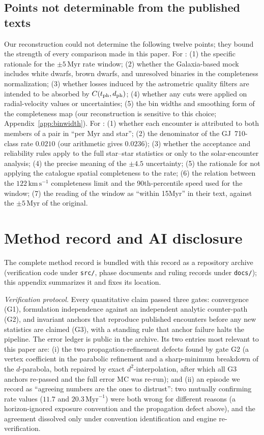 \documentclass[11pt]{article}
\newcommand{\Myr}{\,\mathrm{Myr}}
\newcommand{\kms}{\,\mathrm{km\,s^{-1}}}
\begin{document}
\subsection{Points not determinable from the published texts}
\label{app:limits}
Our reconstruction could not determine the following twelve points; they
bound the strength of every comparison made in this paper. For \cite{bj18}:
(1) the specific rationale for the $\pm5\Myr$ rate window; (2) whether the
Galaxia-based mock includes white dwarfs, brown dwarfs, and unresolved
binaries in the completeness normalization; (3) whether losses induced by
the astrometric quality filters are intended to be absorbed by
$C(t_{\rm ph},d_{\rm ph})$; (4) whether any cuts were applied on
radial-velocity values or uncertainties; (5) the bin widths and smoothing
form of the completeness map (our reconstruction is sensitive to this
choice; Appendix~\ref{app:binwidth}). For \cite{fp26}: (1) whether each
encounter is attributed to both members of a pair in ``per Myr and star'';
(2) the denominator of the GJ~710-class rate $0.0210$ (our arithmetic gives
$0.0236$); (3) whether the acceptance and reliability rules apply to the
full star--star statistics or only to the solar-encounter analysis; (4) the
precise meaning of the $\pm4.5$ uncertainty; (5) the rationale for not
applying the catalogue spatial completeness to the rate; (6) the relation
between the $122\kms$ completeness limit and the 90th-percentile speed used
for the window; (7) the reading of the \cite{bj18} window as ``within
15\;Myr'' in their text, against the $\pm5\Myr$ of the original.

\section{Method record and AI disclosure}\label{app:method}
The complete method record is bundled with this record as a repository
archive (verification code under \texttt{src/}, phase documents and ruling
records under \texttt{docs/}); this appendix summarizes it and fixes its
location.

\emph{Verification protocol.} Every quantitative claim passed three gates:
convergence (G1), formulation independence against an independent analytic
counter-path (G2), and invariant anchors that reproduce published
encounters before any new statistics are claimed (G3), with a standing rule
that anchor failure halts the pipeline. The error ledger is public in the
archive. Its two entries most relevant to this paper are: (i) the two
propagation-refinement defects found by gate G2 (a vertex coefficient in
the parabolic refinement and a sharp-minimum breakdown of the $d$-parabola,
both repaired by exact $d^2$-interpolation, after which all G3 anchors
re-passed and the full error MC was re-run); and (ii) an episode we record
as ``agreeing numbers are the ones to distrust'': two mutually confirming
rate values ($11.7$ and $20.3\Myr^{-1}$) were both wrong for different
reasons (a horizon-ignored exposure convention and the propagation defect
above), and the agreement dissolved only under convention identification
and engine re-verification.
\end{document}
